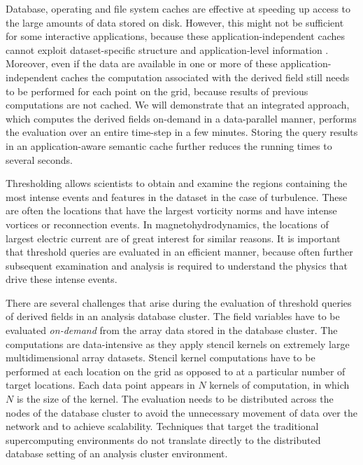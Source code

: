 \documentclass{sig-alternate}
\begin{document}

Database, operating and file system caches are effective at speeding up access to the large amounts of data stored on disk. However, this might not be
sufficient for some interactive applications, because these application-independent caches cannot exploit dataset-specific structure and applica\-tion-level
information \cite{Lopez}. Moreover, even if the data are available in one or more of these application-independent caches the computation associated 
with the derived field still needs to be performed for each point on the grid, because results of previous computations are not cached. 
We will demonstrate that an integrated approach, which computes the derived fields on-demand in a data-parallel manner, performs the evaluation over 
an entire time-step in a few minutes. Storing the query results in an application-aware semantic cache further reduces the running times to several 
seconds.

Thresholding allows scientists to obtain and examine the regions containing the most intense events and features in the dataset in the case of turbulence. 
These are often the locations that have the largest vorticity norms and have intense vortices or reconnection events. 
In magnetohydrodynamics, the locations of largest electric current are of great interest for similar reasons.
It is important that threshold queries are evaluated in an efficient manner, because often further subsequent examination
and analysis is required to understand the physics that drive these intense events. 

There are several challenges that arise during the evaluation of threshold queries of derived fields in an analysis database cluster. The field variables have to be
evaluated \emph{on-demand} from the array data stored in the database cluster. The computations are data-intensive as they apply stencil kernels on extremely
large multidimensional array datasets. 
Stencil kernel computations have to be performed at each location on the grid as opposed to at a particular number of target locations. 
Each data point appears in $N$ kernels of computation, in which $N$ is the size of the kernel.
The evaluation needs to be distributed across the nodes of the database cluster to avoid the unnecessary movement of data over 
the network and to achieve scalability.
Techniques that target the traditional supercomputing environments do not translate directly to the 
distributed database setting of an analysis cluster environment. 
\end{document}
